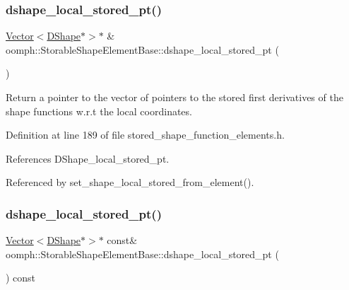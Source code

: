 \subsubsection{\texorpdfstring{dshape\+\_\+local\+\_\+stored\+\_\+pt()}{dshape\_local\_stored\_pt()}\hspace{0.1cm}{\footnotesize\ttfamily [1/2]}}
{\footnotesize\ttfamily \hyperlink{classoomph_1_1Vector}{Vector}$<$\hyperlink{classoomph_1_1DShape}{D\+Shape}$\ast$$>$$\ast$ \& oomph\+::\+Storable\+Shape\+Element\+Base\+::dshape\+\_\+local\+\_\+stored\+\_\+pt (\begin{DoxyParamCaption}{ }\end{DoxyParamCaption})\hspace{0.3cm}{\ttfamily [inline]}}



Return a pointer to the vector of pointers to the stored first derivatives of the shape functions w.\+r.\+t the local coordinates. 



Definition at line 189 of file stored\+\_\+shape\+\_\+function\+\_\+elements.\+h.



References D\+Shape\+\_\+local\+\_\+stored\+\_\+pt.



Referenced by set\+\_\+shape\+\_\+local\+\_\+stored\+\_\+from\+\_\+element().

\mbox{\label{classoomph_1_1StorableShapeElementBase_aeda3b465ee4fb0af2f55dffa53046cc9}} 
\subsubsection{\texorpdfstring{dshape\+\_\+local\+\_\+stored\+\_\+pt()}{dshape\_local\_stored\_pt()}\hspace{0.1cm}{\footnotesize\ttfamily [2/2]}}
{\footnotesize\ttfamily \hyperlink{classoomph_1_1Vector}{Vector}$<$\hyperlink{classoomph_1_1DShape}{D\+Shape}$\ast$$>$$\ast$ const\& oomph\+::\+Storable\+Shape\+Element\+Base\+::dshape\+\_\+local\+\_\+stored\+\_\+pt (\begin{DoxyParamCaption}{ }\end{DoxyParamCaption}) const\hspace{0.3cm}{\ttfamily [inline]}}



